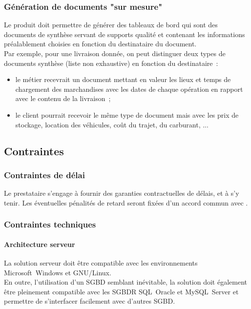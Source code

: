 \subsubsection{Génération de documents "sur mesure"}
Le produit doit permettre de générer des \og{}tableaux de bord\fg{} qui sont des documents de synthèse servant de supports qualité et contenant les informations préalablement choisies en fonction du destinataire du document.
\\
Par exemple, pour une livraison donnée, on peut distinguer deux types de documents synthèse (liste non exhaustive) en fonction du destinataire~:
\begin{itemize}
\item le métier recevrait un document mettant en valeur les lieux et temps de chargement des marchandises avec les dates de chaque opération en rapport avec le contenu de la livraison~;
\item le client pourrait recevoir le même type de document mais avec les prix de stockage, location des véhicules, coût du trajet, du carburant, ...
\end{itemize}

\subsection{Contraintes}

\subsubsection{Contraintes de délai}
Le prestataire s'engage à fournir des garanties contractuelles de délais, et à s'y tenir. Les éventuelles pénalités de retard seront fixées d'un accord commun avec \mo.

\subsubsection{Contraintes techniques}

\paragraph{Architecture serveur}
La solution serveur doit être compatible avec les environnements Microsoft~Windows et GNU/Linux.
\\
En outre, l'utilisation d'un SGBD semblant inévitable, la solution doit également être pleinement compatible avec les SGBDR SQL~Oracle et MySQL~Server et permettre de s'interfacer facilement avec d'autres SGBD.

